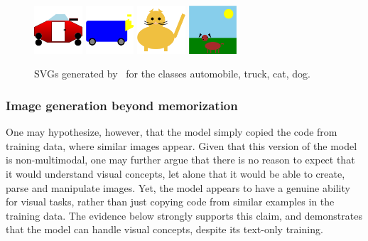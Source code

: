 \begin{figure}[ht]
	\centering
	\includegraphics[width=0.16\textwidth]{Section 2/automobile_2d.png}
	\hspace{0.2in}
	\includegraphics[width=0.16\textwidth]{Section 2/truck_2d.png}
	\hspace{0.2in}
	\includegraphics[width=0.16\textwidth]{Section 2/cat_2d.png}
	\hspace{0.2in}
	\includegraphics[width=0.16\textwidth]{Section 2/dog_2d.png}
	\caption{SVGs generated by \DV \ for the classes automobile, truck, cat, dog.}
	\label{fig:2d}
\end{figure}

\subsubsection{Image generation beyond memorization}
One may hypothesize, however, that the model simply copied the code from training data, where similar images appear. Given that this version of the model is non-multimodal, one may further argue that there is no reason to expect that it would understand visual concepts, let alone that it would be able to create, parse and manipulate images. Yet, the model appears to have a genuine ability for visual tasks, rather than just copying code from similar examples in the training data. The evidence below strongly supports this claim, and demonstrates that the model can handle visual concepts, despite its text-only training.
\newline

